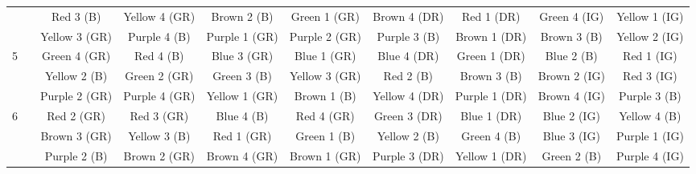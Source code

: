 \begin{tabular}{lc*{8}c}
	&	&	Red 3 (B)	&	Yellow 4 (GR)	&	Brown 2 (B)	&	Green 1 (GR)	&	Brown 4 (DR)	&	Red 1 (DR)	&	Green 4 (IG)	&	Yellow 1 (IG)	\\
	&	&	Yellow 3 (GR)	&	Purple 4 (B)	&	Purple 1 (GR)	&	Purple 2 (GR)	&	Purple 3 (B)	&	Brown 1 (DR)	&	Brown 3 (B)	&	Yellow 2 (IG) \\
	\midrule
	\multirow{3}{*}{5}	&	&	Green 4 (GR)	&	Red 4 (B)	&	Blue 3 (GR)	&	Blue 1 (GR)	&	Blue 4 (DR)	&	Green 1 (DR)	&	Blue 2 (B)		&	Red 1 (IG)	\\
	&	&	Yellow 2 (B)	&	Green 2 (GR)	&	Green 3 (B)	&	Yellow 3 (GR)	&	Red 2 (B)	&	Brown 3 (B)	&	Brown 2 (IG)	&	Red 3 (IG)	\\
	&	&	Purple 2 (GR)	&	Purple 4 (GR)	&	Yellow 1 (GR)	&	Brown 1 (B)	&	Yellow 4 (DR)	&	Purple 1 (DR)	&	Brown 4 (IG)	&	Purple 3 (B)	\\
	\midrule
	\multirow{3}{*}{6}
	&	&	Red 2 (GR)	&	Red 3 (GR)	&	Blue 4 (B)		&	Red 4 (GR)	&	Green 3 (DR)	&	Blue 1 (DR)	&	Blue 2 (IG)	&	Yellow 4 (B)	\\
	&	&	Brown 3 (GR)	&	Yellow 3 (B)	&	Red 1 (GR)	&	Green 1 (B)	&	Yellow 2 (B)	&	Green 4 (B)	&	Blue 3 (IG)	&	Purple 1 (IG)	\\
	&	&	Purple 2 (B)	&	Brown 2 (GR)	&	Brown 4 (GR)	&	Brown 1 (GR)	&	Purple 3 (DR)	&	Yellow 1 (DR)	&	Green 2 (B)	&	Purple 4 (IG)	\\
	\bottomrule
\end{tabular}


%